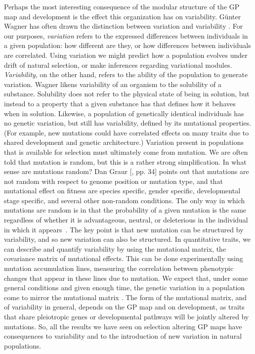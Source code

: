 \begin{refsection}
Perhaps the most interesting consequence of the modular structure of the
GP map and development is the effect this organization has on
variability. Günter Wagner has
often drawn the distinction between variation and variability
\parencite{Wagner1996-ui}. For our purposes, \emph{variation} refers to the
expressed differences between individuals in a given population: how
different are they, or how differences between individuals are
correlated. Using variation we might predict how a population evolves
under drift of natural selection, or make inferences regarding
variational modules. \emph{Variability}, on the other hand, refers to
the ability of the population to generate variation. Wagner likens
variability of an organism to the solubility of a substance. Solubility
does not refer to the physical state of being in solution, but instead
to a property that a given substance has that defines how it behaves
when in solution. Likewise, a population of genetically identical
individuals has no genetic variation, but still has variability, defined
by its mutational properties. (For example, new mutations could have
correlated effects on many traits due to shared development and genetic
architecture.) Variation present in populations that is available for
selection must ultimately come from mutation. We are often told that
mutation is random, but this is a rather strong simplification. In what
sense are mutations random? Dan Graur {[}\textcite{Graur2015-th}, pp. 34{]}
points out that mutations are not random with respect to genome position
or mutation type, and that mutational effect on fitness are species
specific, gender specific, developmental stage specific, and several
other non-random conditions. The only way in which mutations are random
is in that the probability of a given mutation is the same regardless of
whether it is advantageous, neutral, or deleterious in the individual in
which it appears~\parencite{Luria1943-se}. The key point is that new mutation
can be structured by variability, and so new variation can also be
structured. In quantitative traits, we can describe and quantify
variability by using the mutational matrix, the covariance matrix of
mutational effects. This can be done experimentally using mutation
accumulation lines, measuring the correlation between phenotypic changes
that appear in these lines due to mutation. We expect that, under some
general conditions and given enough time, the genetic variation in a
population come to mirror the mutational matrix
\parencite{Lande1980-kn, Cheverud1984-mi, Jones2007-xe}. The form of the
mutational matrix, and of variability in general, depends on the GP map
and on development, as traits that share pleiotropic genes or
developmental pathways will be jointly altered by mutations. So, all the
results we have seen on selection altering GP maps have consequences to
variability and to the introduction of new variation in natural
populations.


\end{refsection}
